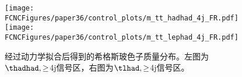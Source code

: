 
\begin{figure}[H]
\centering
\texttt{[image: \\FCNCFigures/paper36/control\_plots/m\_tt\_hadhad\_4j\_FR.pdf]}
\texttt{[image: \\FCNCFigures/paper36/control\_plots/m\_tt\_lephad\_4j\_FR.pdf]}
\caption{经过动力学拟合后得到的希格斯玻色子质量分布。左图为$\thadhad,\ge$4j信号区，右图为$\tlhad,\ge$4j信号区。}
\label{fig:higgsmass36}
\end{figure}
